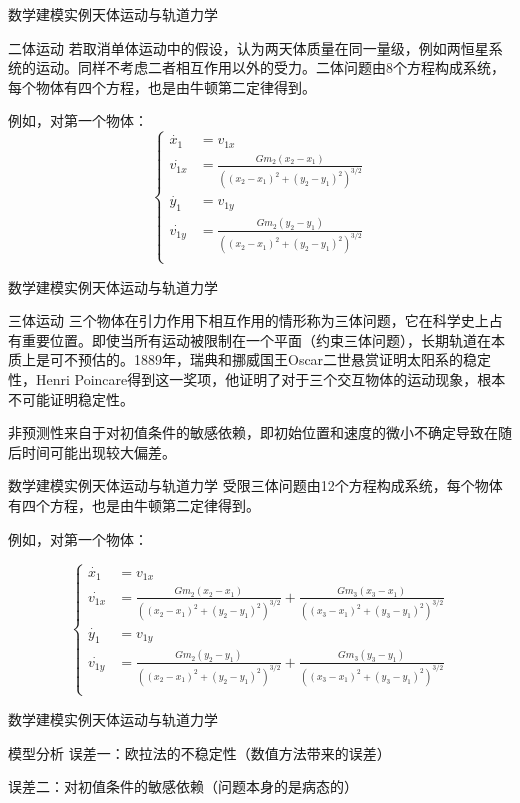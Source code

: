 \documentclass{beamer}
\begin{document}
\begin{frame}{数学建模实例}{天体运动与轨道力学}
\begin{block}{二体运动}
若取消单体运动中的假设，认为两天体质量在同一量级，例如两恒星系统的运动。同样不考虑二者相互作用以外的受力。二体问题由8个方程构成系统，每个物体有四个方程，也是由牛顿第二定律得到。

例如，对第一个物体：
$$
\left \{
\begin{aligned}
\dot{x_1}   & =  v_{1x} \\
\dot{v_{1x}} & =  \frac{G{m_2}(x_2-x_1)}{((x_2-x_1)^2+(y_2-y_1)^2)^{3/2}} \\
\dot{y_1}   & =  v_{1y} \\
\dot{v_{1y}} & =  \frac{G{m_2}(y_2-y_1)}{((x_2-x_1)^2+(y_2-y_1)^2)^{3/2}} \\
\end{aligned}
\right. 
$$

\end{block}
\end{frame}

\begin{frame}{数学建模实例}{天体运动与轨道力学}
\begin{block}{三体运动}
三个物体在引力作用下相互作用的情形称为三体问题，它在科学史上占有重要位置。即使当所有运动被限制在一个平面（约束三体问题），长期轨道在本质上是可不预估的。1889年，瑞典和挪威国王Oscar二世悬赏证明太阳系的稳定性，Henri Poincare得到这一奖项，他证明了对于三个交互物体的运动现象，根本不可能证明稳定性。

非预测性来自于对初值条件的敏感依赖，即初始位置和速度的微小不确定导致在随后时间可能出现较大偏差。

\end{block}
\end{frame}

\begin{frame}{数学建模实例}{天体运动与轨道力学}
受限三体问题由12个方程构成系统，每个物体有四个方程，也是由牛顿第二定律得到。

例如，对第一个物体：

$$
\left \{
\begin{aligned}
\dot{x_1}   & =  v_{1x} \\
\dot{v_{1x}} & =  \frac{G{m_2}(x_2-x_1)}{((x_2-x_1)^2+(y_2-y_1)^2)^{3/2}}+\frac{G{m_3}(x_3-x_1)}{((x_3-x_1)^2+(y_3-y_1)^2)^{3/2}} \\
\dot{y_1}   & =  v_{1y} \\
\dot{v_{1y}} & =  \frac{G{m_2}(y_2-y_1)}{((x_2-x_1)^2+(y_2-y_1)^2)^{3/2}}+\frac{G{m_3}(y_3-y_1)}{((x_3-x_1)^2+(y_3-y_1)^2)^{3/2}} \\
\end{aligned}
\right. 
$$
\end{frame}

\begin{frame}{数学建模实例}{天体运动与轨道力学}
\begin{block}{模型分析}
误差一：欧拉法的不稳定性（数值方法带来的误差）

误差二：对初值条件的敏感依赖（问题本身的是病态的）
\end{block}
\end{frame}
\end{document}
